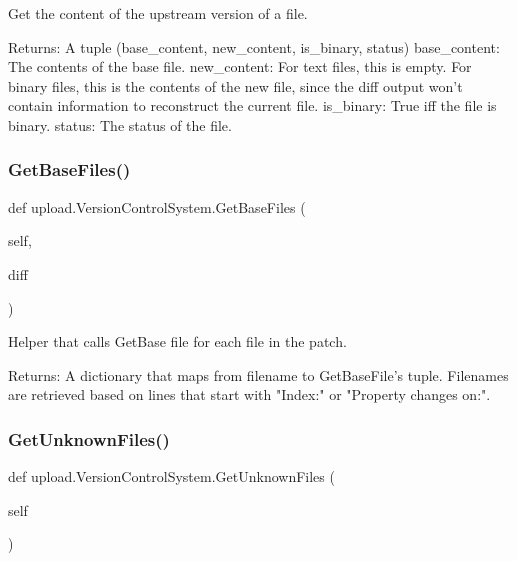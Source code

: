 \begin{DoxyVerb}Get the content of the upstream version of a file.

Returns:
  A tuple (base_content, new_content, is_binary, status)
base_content: The contents of the base file.
new_content: For text files, this is empty.  For binary files, this is
  the contents of the new file, since the diff output won't contain
  information to reconstruct the current file.
is_binary: True iff the file is binary.
status: The status of the file.
\end{DoxyVerb}
 \mbox{\label{classupload_1_1_version_control_system_a812c3b3daf90c88b015fa4b26252e291}} 
\subsubsection{\texorpdfstring{Get\+Base\+Files()}{GetBaseFiles()}}
{\footnotesize\ttfamily def upload.\+Version\+Control\+System.\+Get\+Base\+Files (\begin{DoxyParamCaption}\item[{}]{self,  }\item[{}]{diff }\end{DoxyParamCaption})}

\begin{DoxyVerb}Helper that calls GetBase file for each file in the patch.

Returns:
  A dictionary that maps from filename to GetBaseFile's tuple.  Filenames
  are retrieved based on lines that start with "Index:" or
  "Property changes on:".
\end{DoxyVerb}
 \mbox{\label{classupload_1_1_version_control_system_a56a60e56aa9aff3df4001d2f84cab884}} 
\subsubsection{\texorpdfstring{Get\+Unknown\+Files()}{GetUnknownFiles()}}
{\footnotesize\ttfamily def upload.\+Version\+Control\+System.\+Get\+Unknown\+Files (\begin{DoxyParamCaption}\item[{}]{self }\end{DoxyParamCaption})}

